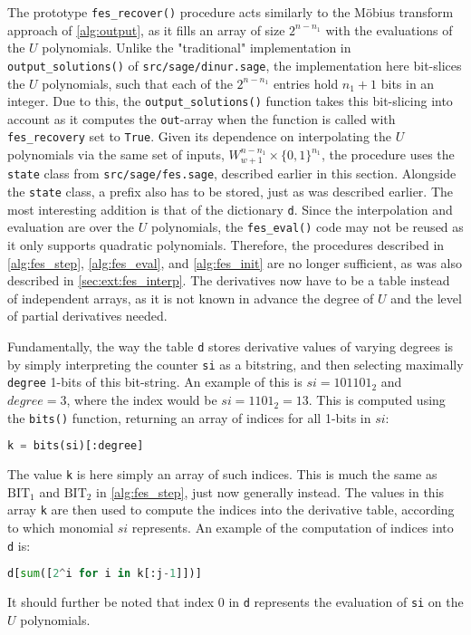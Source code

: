 The prototype \texttt{fes\_recover()} procedure acts similarly to the Möbius transform approach of \cref{alg:output}, as it fills an array of size $2^{n - n_1}$ with the evaluations of the $U$ polynomials. Unlike the "traditional" implementation in \texttt{output\_solutions()} of \texttt{src/sage/dinur.sage}, the implementation here bit-slices the $U$ polynomials, such that each of the $2^{n - n_1}$ entries hold $n_1 + 1$ bits in an integer. Due to this, the \texttt{output\_solutions()} function takes this bit-slicing into account as it computes the \texttt{out}-array when the function is called with \texttt{fes\_recovery} set to \texttt{True}.
Given its dependence on interpolating the $U$ polynomials via the same set of inputs, $W^{n - n_1}_{w + 1} \times \{0,1\}^{n_1}$, the procedure uses the \texttt{state} class from \texttt{src/sage/fes.sage}, described earlier in this section. Alongside the \texttt{state} class, a prefix also has to be stored, just as was described earlier. The most interesting addition is that of the dictionary \texttt{d}. Since the interpolation and evaluation are over the $U$ polynomials, the \texttt{fes\_eval()} code may not be reused as it only supports quadratic polynomials. Therefore, the procedures described in \cref{alg:fes_step}, \cref{alg:fes_eval}, and \cref{alg:fes_init} are no longer sufficient, as was also described in \cref{sec:ext:fes_interp}. The derivatives now have to be a table instead of independent arrays, as it is not known in advance the degree of $U$ and the level of partial derivatives needed.

Fundamentally, the way the table \texttt{d} stores derivative values of varying degrees is by simply interpreting the counter \texttt{si} as a bitstring, and then selecting maximally \texttt{degree} 1-bits of this bit-string. An example of this is $si = 101101_2$ and $degree = 3$, where the index would be $si = 1101_2 = 13$. This is computed using the \texttt{bits()} function, returning an array of indices for all 1-bits in $si$:
\begin{lstlisting}[language=Python,style=mystyle]
k = bits(si)[:degree]
\end{lstlisting}
The value \texttt{k} is here simply an array of such indices. This is much the same as $\text{BIT}_1$ and $\text{BIT}_2$ in \cref{alg:fes_step}, just now generally instead. The values in this array \texttt{k} are then used to compute the indices into the derivative table, according to which monomial $si$ represents. An example of the computation of indices into \texttt{d} is:
\begin{lstlisting}[language=Python,style=mystyle]
d[sum([2^i for i in k[:j-1]])]
\end{lstlisting}
It should further be noted that index $0$ in \texttt{d} represents the evaluation of \texttt{si} on the $U$ polynomials. 

